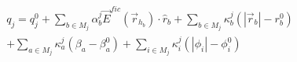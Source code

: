 \documentclass[12pt]{article}
\begin{document}
  \begin{eqnarray*}
    q_{j} = q_{j}^{0} + \sum_{b \in M_{j}} \alpha_{b}^{j}
    \vec{E}^{fic} \left( \vec{r}_{h_{b}} \right) \cdot \hat{r}_{b}
    + \sum_{b \in M_{j}} \kappa_{b}^{j} \left(\left|\vec{r}_{b}\right|
    - r_{b}^{0}\right) \\
    + \sum_{a \in M_{j}} \kappa_{a}^{j} \left(\beta_{a} -
    \beta_{a}^{0}\right) + \sum_{i \in M_{j}} \kappa_{i}^{j} \left(\left| 
    \phi_{i}\right| - \phi_{i}^{0}\right)
  \end{eqnarray*}
\end{document}

